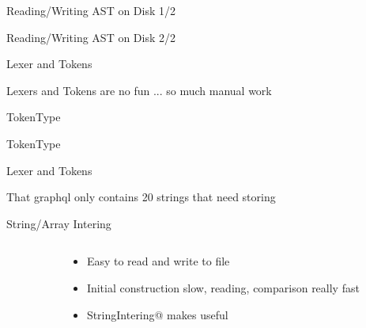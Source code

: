 \documentclass[aspectratio=169,notes]{beamer}
\begin{document}
	\begin{frame}[fragile]{Reading/Writing AST on Disk 1/2}
		
	\end{frame}

	\begin{frame}[fragile]{Reading/Writing AST on Disk 2/2}
		
	\end{frame}

	\begin{frame}[fragile]{Lexer and Tokens}
		\begin{center}
		\large
		Lexers and Tokens are no fun ... so much manual work
		\end{center}
	\end{frame}

	\begin{frame}[fragile]{TokenType}
		
	\end{frame}

	\begin{frame}[fragile]{TokenType}
		
	\end{frame}

	\begin{frame}[fragile]{Lexer and Tokens}
		

		That graphql only contains 20 strings that need storing
	\end{frame}

	\begin{frame}[fragile]{String/Array Intering}
		\begin{columns}[t]
			\begin{column}{0.65\textwidth}
				
			\end{column}
			\pause
			\begin{column}{0.35\textwidth}
				\begin{itemize}
					\item Easy to read and write to file
					\item Initial construction slow, reading, comparison really fast
					\item \lstinline@const StringIntering@ makes \lstinline@const@ useful
				\end{itemize}
			\end{column}
		\end{columns}
	\end{frame}
\end{document}
